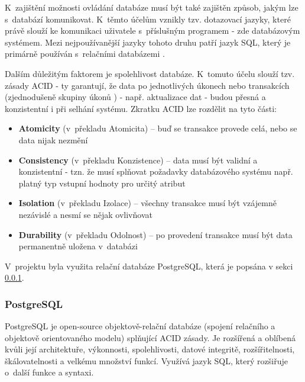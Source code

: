 	K~zajištění možnosti ovládání databáze musí být také zajištěn způsob, jakým lze s~databází komunikovat. K~těmto účelům vznikly tzv. dotazovací jazyky, které právě slouží ke komunikaci uživatele s~příslušným programem \cite{DotazJazyk} - zde databázovým systémem. Mezi nejpoužívanější jazyky tohoto druhu patří jazyk SQL, který je primárně používán s~relačními databázemi \cite{SQL}.
	
	Dalším důležitým faktorem je spolehlivost databáze. K~tomuto účelu slouží tzv. zásady ACID - ty garantují, že data po jednotlivých úkonech nebo transakcích (zjednodušeně skupiny úkonů \cite{Transakce}) - např. aktualizace dat - budou přesná a konzistentní i při selhání systému. Zkratku ACID lze rozdělit na tyto části:
	
	\begin{itemize}
		\item \textbf{Atomicity} (v~překladu Atomicita) – buď se transakce provede celá, nebo se data nijak nezmění \cite{ACID}
		\item \textbf{Consistency} (v~překladu Konzistence) – data musí být validní a konzistentní - tzn. že musí splňovat požadavky databázového systému např. platný typ vstupní hodnoty pro určitý atribut \cite{ACID}
		\item \textbf{Isolation} (v~překladu Izolace) – všechny transakce musí být vzájemně nezávislé a nesmí se nějak ovlivňovat \cite{ACID}
		\item \textbf{Durability} (v~překladu Odolnost) – po provedení transakce musí být data permanentně uložena v~databázi \cite{ACID}
	\end{itemize}
	
	V~projektu byla využita relační databáze PostgreSQL, která je popsána v sekci \ref{sec:pgsql}.
	
		\subsubsection{PostgreSQL}\label{sec:pgsql}
		PostgreSQL je open-source objektově-relační databáze (spojení relačního a objektově orientovaného modelu) splňující ACID zásady. Je rozšířená a oblíbená kvůli její architektuře, výkonnosti, spolehlivosti, datové integritě, rozšířitelnosti, škálovatelnosti a velkému množství funkcí. Využívá jazyk SQL, který rozšiřuje o~další funkce a syntaxi. \cite{PostgreSQL}
